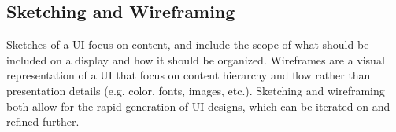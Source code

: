 \documentclass[12pt,titlepage]{article}
\begin{document}
      \subsection{Sketching and Wireframing}
        Sketches of a UI focus on content, and include the scope of what should be included on a display and how it should be organized. Wireframes are a visual representation of a UI
        that focus on content hierarchy and flow rather than presentation details (e.g. color, fonts, images, etc.). Sketching and wireframing both allow for the rapid generation of
        UI designs, which can be iterated on and refined further.
\end{document}

